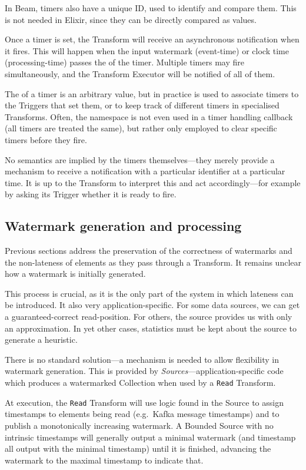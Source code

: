 \footnotetext
{
In Beam, timers also have a unique ID, used to identify and compare them. This is not needed in Elixir, since they can be directly compared as values.
}

Once a timer is set, the Transform will receive an asynchronous notification when it fires.
This will happen when the input watermark (event-time) or clock time (processing-time) passes the  of the timer.
Multiple timers may fire simultaneously, and the Transform Executor will be notified of all of them.

The  of a timer is an arbitrary value, but in practice is used to associate timers to the Triggers that set them, or to keep track of different timers in specialised Transforms.
Often, the namespace is not even used in a timer handling callback (all timers are treated the same), but rather only employed to clear specific timers before they fire.

No semantics are implied by the timers themselves---they merely provide a mechanism to receive a notification with a particular identifier at a particular time.
It is up to the Transform to interpret this and act accordingly---for example by asking its Trigger whether it is ready to fire.

\subsection{Watermark generation and processing}\label{sec:impl:dataflow:watermark-generation}

Previous sections address the preservation of the correctness of watermarks and the non-lateness of elements as they pass through a Transform.
It remains unclear how a watermark is initially generated.

This process is crucial, as it is the only part of the system in which lateness can be introduced.
It also very application-specific.
For some data sources, we can get a guaranteed-correct read-position.
For others, the source provides us with only an approximation.
In yet other cases, statistics must be kept about the source to generate a heuristic.

There is no standard solution---a mechanism is needed to allow flexibility in watermark generation.
This is provided by \emph{Sources}---application-specific code which produces a watermarked Collection when used by a \verb|Read| Transform.

At execution, the \verb|Read| Transform will use logic found in the Source to assign timestamps to elements being read (e.g.\ Kafka message timestamps) and to publish a monotonically increasing watermark.
A Bounded Source with no intrinsic timestamps will generally output a minimal watermark (and timestamp all output with the minimal timestamp) until it is finished, advancing the watermark to the maximal timestamp to indicate that.

